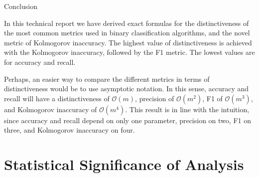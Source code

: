 Conclusion

In this technical report we have derived exact formulas for the distinctiveness of the most common metrics used in binary classification algorithms, and the novel metric of Kolmogorov inaccuracy. The highest value of distinctiveness is achieved with the Kolmogorov inaccuracy, followed by the F1 metric. The lowest values are for accuracy and recall.

Perhaps, an easier way to compare the different metrics in terms of distinctiveness would be to use asymptotic notation. In this sense, accuracy and recall will have a distinctiveness of $\mathcal{O}\left(m\right)$, precision of $\mathcal{O}\left(m^{2}\right)$, F1 of $\mathcal{O}\left(m^{3}\right)$, and Kolmogorov inaccuracy of $\mathcal{O}\left(m^{4}\right)$. This result is in line with the intuition, since accuracy and recall depend on only one parameter, precision on two, F1 on three, and Kolmogorov inaccuracy on four.


\section{Statistical Significance of Analysis}
